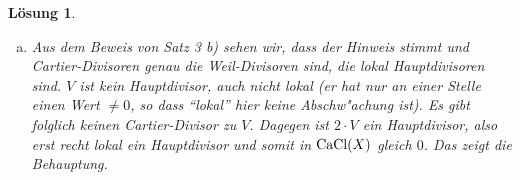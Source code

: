 \documentclass[paper = A4, fontsize=12pt, numbers=noendperiod, chapterprefix=true]{scrbook}
\theoremstyle{break}
\newtheorem{Loes}{L\"osung}
\theoremstyle{nonumberbreak}
\theoremstyle{nonumberplain}
\DeclareMathOperator{\Cl}{Cl}
\DeclareMathOperator{\Spec}{Spec}
\DeclareMathOperator{\ord}{ord}
\newcommand{\calO}{\mathcal{O}}
\newcommand{\FakRaum}[2]{
	\raisebox{0.7ex}{\ensuremath{#1}}
	\ensuremath{\mkern-3mu}\big/\ensuremath{\mkern-3mu}
	\raisebox{-0.6ex}{\ensuremath{#2}}}
\begin{document}
\begin{Loes}
\begin{enumerate}[a)]
	$X \setminus V = \Spec(D(y)) = \Spec R$, $R_y = \FakRaum{k[x,y,y^{-1},z]}{xy-z^2} \cong k[y,y^{-1},z] = k[y,z]_y$
	
	$R$ noethersch $\Rightarrow R_y$ noethersch $\xRightarrow{\text{Prop. \ref{11.3}}} \Cl(X\setminus V) = 0$


	Wir wissen, dass $\textup{Cl}(X)$ von $V$ erzeugt wird und dass $2 \cdot V$ ein Hauptdivisor ist. Zu zeigen bleibt, dass $V$ kein Hauptdivisor ist, was wir in zwei Schritten beweisen:
 
	\textbf{Behauptung 1:} $q \coloneqq (y,z)$ ist kein Hauptideal (Erinnerung: $V = V(q)$ ).
 
	W"are $q$ ein Hauptideal, so g"abe es ein $f$ mit $f | y$ und $f | z$. Die einzige Relation in $R$ ver"andert den Grad eines Polynoms nicht und kann nicht auf Elemente von Grad $1$ angewendet werde, also m"usste $f$ sogleich $x$ und $y$ sein, was nicht m"oglich ist. 
 
	\textbf{Behauptung 2:} W"are $V = \textrm{div}(f)$ f"ur ein $f \in k(X)$, so w"are $q$ ein Hauptideal. 
 
 Siehe Beweis von Proposition 6.2 im Hartshorne.
 
 
\item 
	Aus dem Beweis von Satz 3 b) sehen wir, dass der Hinweis stimmt und Cartier-Divisoren genau die Weil-Divisoren sind, die lokal Hauptdivisoren sind. $V$ ist kein Hauptdivisor, auch nicht lokal (er hat nur an einer Stelle einen Wert $\neq 0$, so dass "`lokal"' hier keine Abschw"achung ist). Es gibt folglich keinen Cartier-Divisor zu $V$. Dagegen ist $2 \cdot V$ ein Hauptdivisor, also erst recht lokal ein Hauptdivisor und somit in $\textup{CaCl}(X)$ gleich $0$. Das zeigt die Behauptung.
\end{enumerate}\end{Loes}
\end{document}
